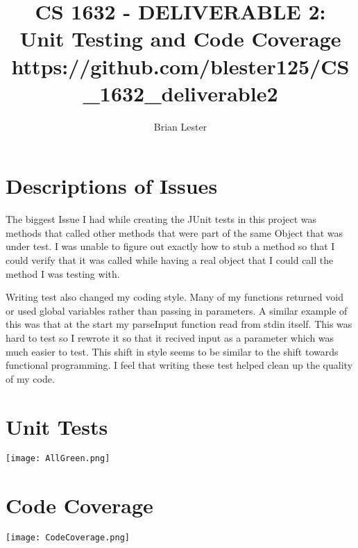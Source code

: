 \documentclass[titlepage,12pt]{article}
\title{CS 1632 - DELIVERABLE 2:\\ 
Unit Testing and Code Coverage\\
{\small https://github.com/blester125/CS\_1632\_deliverable2}}
\author{Brian Lester}
\begin{document}
\maketitle
\section{Descriptions of Issues}
The biggest Issue I had while creating the JUnit tests in this project was
methods that called other methods that were part of the same Object that 
was under test. I was unable to figure out exactly how to stub a method so
that I could verify that it was called while having a real object that I 
could call the method I was testing with.

Writing test also changed my coding style. Many of my functions returned 
void or used global variables rather than passing in parameters. A similar 
example of this was that at the start my parseInput function read from 
stdin itself. This was hard to test so I rewrote it so that it recived 
input as a parameter which was much easier to test. This shift in style 
seems to be similar to the shift towards functional programming. I feel 
that writing these test helped clean up the quality of my code.
\newpage
\section{Unit Tests}
\texttt{[image: AllGreen.png]}
\newpage
\section{Code Coverage}
\texttt{[image: CodeCoverage.png]}
\end{document}

